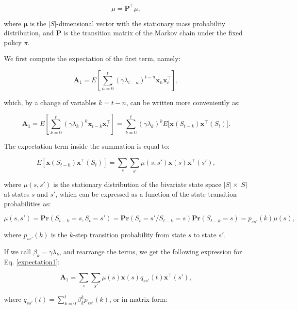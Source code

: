 \documentclass[11pt,A4paper]{article}
\begin{document}
\[ \mu = \mathbf{P}^\intercal \mu, \]

\medskip

where $\mathbf{\mu}$ is the $|S|$-dimensional vector with the stationary mass probability distribution, and $\mathbf{P}$ is the transition matrix of the Markov chain under the fixed policy $\pi$.

\medskip

We first compute the expectation of the first term, namely:

\[ \mathbf{A}_1 = E[ \sum_{n=0}^{t}{ (\gamma \lambda_{t-n})^{t-n} \mathbf{x}_n} \mathbf{x}_t^\intercal ], \]

which, by a change of variables $k = t - n$, can be written more conveniently as:

\begin{equation} \label{expectation1}
\mathbf{A}_1 = E[ \sum_{k=0}^{t}{ (\gamma \lambda_k)^{k} \mathbf{x}_{t-k} \mathbf{x}_t^\intercal } ] = \sum_{k=0}^{t}{ (\gamma \lambda_k)^{k} E[ \mathbf{x}(S_{t-k}) \mathbf{x}^\intercal(S_t) } ].
\end{equation}

The expectation term inside the summation is equal to:

\[ E[ \mathbf{x}(S_{t-k}) \mathbf{x}^\intercal(S_t) ] = \sum_{s} \sum_{s'} { \mu(s, s') \mathbf{x}(s) \mathbf{x}^\intercal(s') }, \]

where $\mu(s,s')$ is the stationary distribution of the bivariate state space $|S| \times |S|$ at states $s$ and $s'$, which can be expressed as a function of the state transition probabilities as:

\[ \mu(s, s') = \mathbf{Pr}(S_{t-k}=s, S_t=s') = \mathbf{Pr}(S_t=s' / S_{t-k}=s) \mathbf{Pr}(S_{t-k}=s) = p_{ss'}(k) \mu(s), \]

where $p_{ss'}(k)$ is the $k$-step transition probability from state $s$ to state $s'$.

\medskip

If we call $\beta_k = \gamma \lambda_k$, and rearrange the terms, we get the following expression for Eq. \eqref{expectation1}:

\medskip

\begin{equation} \label{expectation1-result}
\mathbf{A}_1 = \sum_{s} \sum_{s'} {\mu(s) \mathbf{x}(s) q_{ss'}(t) \mathbf{x}^\intercal(s') },
\end{equation}

where $q_{ss'}(t) = \sum_{k=0}^{t}{ \beta_k^{k} p_{ss'}(k) }$, or in matrix form:
\end{document}
